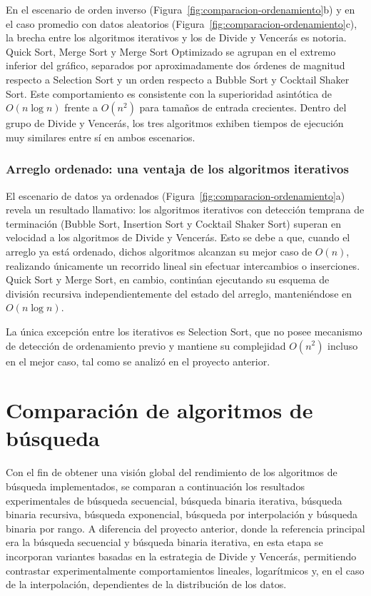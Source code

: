 En el escenario de orden inverso (Figura~\ref{fig:comparacion-ordenamiento}b) y en el caso promedio con datos aleatorios (Figura~\ref{fig:comparacion-ordenamiento}c), la brecha entre los algoritmos iterativos y los de Divide y Vencerás es notoria. Quick Sort, Merge Sort y Merge Sort Optimizado se agrupan en el extremo inferior del gráfico, separados por aproximadamente dos órdenes de magnitud respecto a Selection Sort y un orden respecto a Bubble Sort y Cocktail Shaker Sort. Este comportamiento es consistente con la superioridad asintótica de $O(n \log n)$ frente a $O(n^2)$ para tamaños de entrada crecientes. Dentro del grupo de Divide y Vencerás, los tres algoritmos exhiben tiempos de ejecución muy similares entre sí en ambos escenarios. 

\subsubsection*{Arreglo ordenado: una ventaja de los algoritmos iterativos}
 
El escenario de datos ya ordenados (Figura~\ref{fig:comparacion-ordenamiento}a) revela un resultado llamativo: los algoritmos iterativos con detección temprana de terminación (Bubble Sort, Insertion Sort y Cocktail Shaker Sort) superan en velocidad a los algoritmos de Divide y Vencerás. Esto se debe a que, cuando el arreglo ya está ordenado, dichos algoritmos alcanzan su mejor caso de $O(n)$, realizando únicamente un recorrido lineal sin efectuar intercambios o inserciones. Quick Sort y Merge Sort, en cambio, continúan ejecutando su esquema de división recursiva independientemente del estado del arreglo, manteniéndose en $O(n \log n)$.
 
La única excepción entre los iterativos es Selection Sort, que no posee mecanismo de detección de ordenamiento previo y mantiene su complejidad $O(n^2)$ incluso en el mejor caso, tal como se analizó en el proyecto anterior.


\newpage
\section{Comparación de algoritmos de búsqueda}\label{sec:comparision-search}
Con el fin de obtener una visión global del rendimiento de los algoritmos de búsqueda implementados, se comparan a continuación los resultados experimentales de búsqueda secuencial, búsqueda binaria iterativa, búsqueda binaria recursiva, búsqueda exponencial, búsqueda por interpolación y búsqueda binaria por rango. A diferencia del proyecto anterior, donde la referencia principal era la búsqueda secuencial y búsqueda binaria iterativa, en esta etapa se incorporan variantes basadas en la estrategia de Divide y Vencerás, permitiendo contrastar experimentalmente comportamientos lineales, logarítmicos y, en el caso de la interpolación, dependientes de la distribución de los datos.

